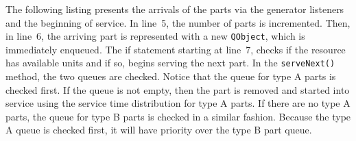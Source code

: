 \documentclass[
]{book}
\theoremstyle{definition}
\theoremstyle{definition}
\theoremstyle{definition}
\theoremstyle{definition}
\theoremstyle{remark}
\begin{document}
The following listing presents the arrivals of the parts via the
generator listeners and the beginning of service. In line~5, the number
of parts is incremented. Then, in line~6, the arriving part is
represented with a new \texttt{QObject}, which is immediately enqueued. The if
statement starting at line~7, checks if the resource has available units
and if so, begins serving the next part. In the \texttt{serveNext()} method, the
two queues are checked. Notice that the queue for type A parts is
checked first. If the queue is not empty, then the part is removed and
started into service using the service time distribution for type A
parts. If there are no type A parts, the queue for type B parts is
checked in a similar fashion. Because the type A queue is checked first,
it will have priority over the type B part queue.
\end{document}
